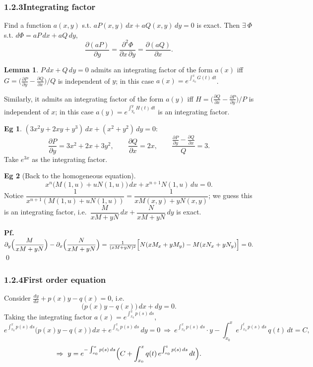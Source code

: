 \documentclass[11pt]{article}
\theoremstyle{definition}
\newtheorem*{lemma}{Lemma}
\newtheorem*{example}{Eg}
\theoremstyle{remark}
\newcommand{\subsecn}[1]{\subsubsection*{#1}}
\begin{document}
\subsecn{1.2.3\quad Integrating factor}

Find a function $a(x,y)$ s.t. $aP(x,y)\,dx + aQ(x,y)\,dy = 0$ is exact. Then $\exists\ \Phi$ s.t.
$d\Phi = aP\,dx + aQ\,dy$,
\[
\frac{\partial(aP)}{\partial y} = \frac{\partial^2\Phi}{\partial x\,\partial y} = \frac{\partial(aQ)}{\partial x}.
\]

\begin{lemma}
$P\,dx + Q\,dy = 0$ admits an integrating factor of the form $a(x)$ iff
$G = \bigl(\frac{\partial P}{\partial y} - \frac{\partial Q}{\partial x}\bigr)/Q$ is independent
of $y$; in this case $a(x) = e^{\int_{x_0}^{x} G(t)\,dt}$.

Similarly, it admits an integrating factor of the form $a(y)$ iff
$H = \bigl(\frac{\partial Q}{\partial x} - \frac{\partial P}{\partial y}\bigr)/P$ is independent
of $x$; in this case $a(y) = e^{\int_{y_0}^{y} H(t)\,dt}$ is an integrating factor.
\end{lemma}

\begin{example}
$(3x^2y + 2xy + y^3)\,dx + (x^2 + y^2)\,dy = 0$:
\[
\frac{\partial P}{\partial y} = 3x^2 + 2x + 3y^2, \qquad
\frac{\partial Q}{\partial x} = 2x, \qquad
\frac{\frac{\partial P}{\partial y} - \frac{\partial Q}{\partial x}}{Q} = 3.
\]
Take $e^{3x}$ as the integrating factor.
\end{example}

\begin{example}[Back to the homogeneous equation]
\[
x^n\bigl(M(1,u) + uN(1,u)\bigr)\,dx + x^{n+1}N(1,u)\,du = 0.
\]
Notice $\dfrac{1}{x^{n+1}(M(1,u) + uN(1,u))} = \dfrac{1}{xM(x,y) + yN(x,y)}$; we guess this is an
integrating factor, i.e.\ $\dfrac{M}{xM+yN}\,dx + \dfrac{N}{xM+yN}\,dy$ is exact.

\textbf{Pf.}\ $\partial_y\Bigl(\dfrac{M}{xM+yN}\Bigr) - \partial_x\Bigl(\dfrac{N}{xM+yN}\Bigr)
= \frac{1}{(xM+yN)^2}\Bigl[N(xM_x + yM_y) - M(xN_x + yN_y)\Bigr] = 0.$ \qed
\end{example}

\subsecn{1.2.4\quad First order equation}

Consider $\frac{dy}{dx} + p(x)y - q(x) = 0$, i.e.
\begin{equation}
\bigl(p(x)y - q(x)\bigr)\,dx + dy = 0. \tag{$*$}
\end{equation}
Taking the integrating factor $a(x) = e^{\int_{x_0}^{x} p(s)\,ds}$,
\[
e^{\int_{x_0}^{x} p(s)\,ds}\bigl(p(x)y - q(x)\bigr)\,dx + e^{\int_{x_0}^{x} p(s)\,ds}\,dy = 0
\ \Rightarrow\ e^{\int_{x_0}^{x} p(s)\,ds}\cdot y - \int_{x_0}^{x} e^{\int_{x_0}^{t} p(s)\,ds}\,q(t)\,dt = C,
\]
\[
\Rightarrow\ y = e^{-\int_{x_0}^{x} p(s)\,ds}\Bigl(C + \int_{x_0}^{x} q(t)\,e^{\int_{x_0}^{t} p(s)\,ds}\,dt\Bigr).
\]
\end{document}
